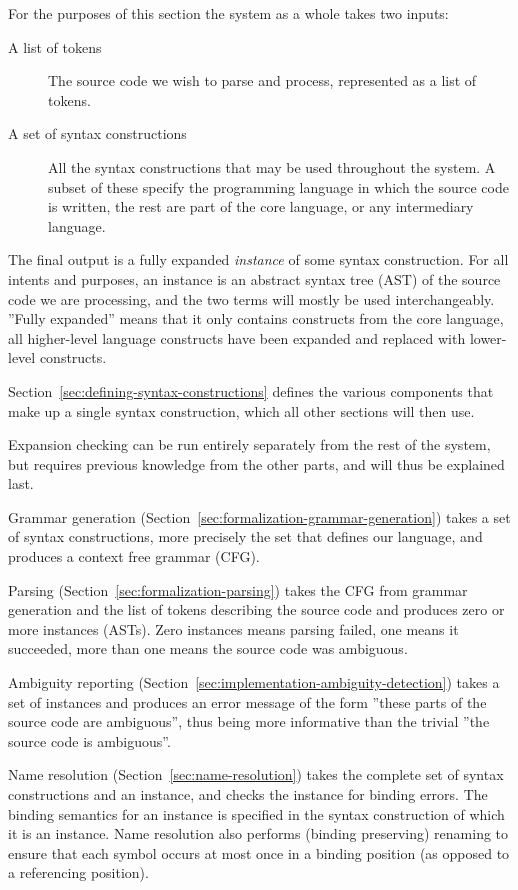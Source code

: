 \documentclass{kththesis}
\begin{document}
For the purposes of this section the system as a whole takes two inputs:

\begin{description}
  \item[A list of tokens] The source code we wish to parse and process, represented as a list of tokens.
  \item[A set of syntax constructions] All the syntax constructions that may be used throughout the system. A subset of these specify the programming language in which the source code is written, the rest are part of the core language, or any intermediary language.
\end{description}

The final output is a fully expanded \emph{instance} of some syntax construction. For all intents and purposes, an instance is an abstract syntax tree (AST) of the source code we are processing, and the two terms will mostly be used interchangeably. ''Fully expanded'' means that it only contains constructs from the core language, all higher-level language constructs have been expanded and replaced with lower-level constructs.

Section~\ref{sec:defining-syntax-constructions} defines the various components that make up a single syntax construction, which all other sections will then use.

Expansion checking can be run entirely separately from the rest of the system, but requires previous knowledge from the other parts, and will thus be explained last.

Grammar generation (Section~\ref{sec:formalization-grammar-generation}) takes a set of syntax constructions, more precisely the set that defines our language, and produces a context free grammar (CFG).

Parsing (Section~\ref{sec:formalization-parsing}) takes the CFG from grammar generation and the list of tokens describing the source code and produces zero or more instances (ASTs). Zero instances means parsing failed, one means it succeeded, more than one means the source code was ambiguous.

Ambiguity reporting (Section~\ref{sec:implementation-ambiguity-detection}) takes a set of instances and produces an error message of the form ''these parts of the source code are ambiguous'', thus being more informative than the trivial ''the source code is ambiguous''.

Name resolution (Section~\ref{sec:name-resolution}) takes the complete set of syntax constructions and an instance, and checks the instance for binding errors. The binding semantics for an instance is specified in the syntax construction of which it is an instance. Name resolution also performs (binding preserving) renaming to ensure that each symbol occurs at most once in a binding position (as opposed to a referencing position).
\end{document}
